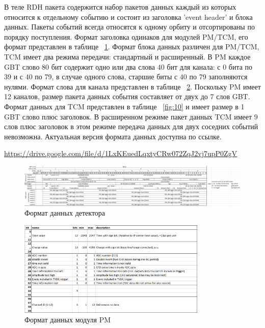 \documentclass{article}
\begin{document}
В теле RDH пакета содержится набор пакетов данных каждый из которых относится к отдельному событию и состоит из заголовка 'event header' и блока данных. Пакеты событий всегда относятся к одному орбиту и отсортированы по порядку поступления. Формат заголовка одинаков для модулей PM/TCM, его формат представлен в таблице ~\ref{fig:8}. Формат блока данных различен для PM/TCM, TCM имеет два режима передачи: стандартный и расширенный. В PM каждое GBT слово 80 бит содержит одно или два слова 40 бит для канала: с 0 бита по 39 и с 40 по 79, в случае одного слова, старшие биты с 40 по 79 заполняются нулями. Формат слова для канала представлен в таблице ~\ref{fig:9}. Поскольку PM имеет 12 каналов, размер пакета данных события составляет от двух до 7 слов GBT. Формат данных для TCM представлен в таблице ~\ref{fig:10} и имеет размер в 1 GBT слово плюс заголовок. В расширенном режиме пакет данных TCM имеет 9 слов плюс заголовок в этом режиме передача данных для двух соседних событий невозможна. Актуальная версия формата данных доступна по ссылке.

\url{https://drive.google.com/file/d/1LxKEuedLqxtyCRw072ZqJ2vj7upP0ZgV}



\begin{figure}[H]
	\centering 
	\includegraphics[width=1\textwidth]{readout_format.png}
	\caption{\label{fig:8} Формат данных детектора}
\end{figure}

\begin{figure}[H]
	\centering 
	\includegraphics[width=0.8\textwidth]{PM_data.png}
	\caption{\label{fig:9} Формат данных модуля PM}
\end{figure}
\end{document}
